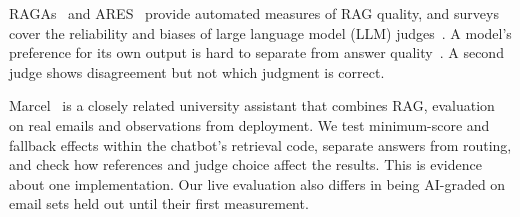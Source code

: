 RAGAs~\cite{es2024ragas} and ARES~\cite{saadfalcon2024ares} provide automated measures of RAG quality, and surveys cover the reliability and biases of large language model (LLM) judges~\cite{gu2024llmjudge,zheng2023judge}. A model's preference for its own output is hard to separate from answer quality~\cite{chen2025selfpreference}. A second judge shows disagreement but not which judgment is correct.

Marcel~\cite{trienes2025marcel} is a closely related university assistant that combines RAG, evaluation on real emails and observations from deployment. We test minimum-score and fallback effects within the chatbot's retrieval code, separate answers from routing, and check how references and judge choice affect the results. This is evidence about one implementation. Our live evaluation also differs in being AI-graded on email sets held out until their first measurement.
